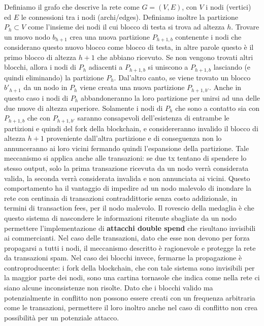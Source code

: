Definiamo il grafo che descrive la rete come $G = (V,E)$, con $V$ i nodi
(vertici) ed $E$ le connessioni tra i nodi (archi/edges). Definiamo
inoltre la partizione $P_h \subset V$ come l'insieme dei nodi il cui
blocco di testa si trova ad altezza $h$. Trovare un nuovo nodo $b_{h+1}$
crea una nuova partizione $P_{h+1,b}$ contenente i nodi che considerano
questo nuovo blocco come blocco di testa, in altre parole questo è il
primo blocco di altezza $h+1$ che abbiano ricevuto. Se non vengono
trovati altri blocchi, allora i nodi di $P_h$ adiacenti a $P_{h+1,b}$ si
uniscono a $P_{h+1,b}$ lasciando (e quindi eliminando) la partizione
$P_h$. Dal'altro canto, se viene trovato un blocco $b'_{h+1}$ da un nodo
in $P_h$ viene creata una nuova partizione $P_{h+1,b'}$. Anche in questo
caso i nodi di $P_h$ abbandoneranno la loro partizione per unirsi ad una
delle due nuove di altezza superiore. Solamente i nodi di $P_h$ che sono
a contatto sia con $P_{h+1,b}$ che con $P_{h+1,b'}$ saranno consapevoli
dell'esistenza di entrambe le partizioni e quindi del fork della
blockchain, e considereranno invalido il blocco di altezza $h+1$
proveniente dall'altra partizione e di conseguenza non lo annunceranno
ai loro vicini fermando quindi l'espansione della partizione. Tale
meccanismo si applica anche alle transazioni: se due tx tentano di
spendere lo stesso output, solo la prima transazione ricevuta da un nodo
verrà considerata valida, la seconda verrà considerata invalida e non
annunciata ai vicini. Questo comportamento ha il vantaggio di impedire
ad un nodo malevolo di inondare la rete con centinaia di transazioni
contraddittorie senza costo addizionale, in termini di transaction fees,
per il nodo malevolo. Il rovescio della medaglia è che questo sistema di
nascondere le informazioni ritenute sbagliate da un nodo permettere
l'implementazione di \textbf{attacchi double spend} che risultano
invisibili ai commercianti. Nel caso delle transazioni, dato che esse
non devono per forza propagarsi a tutti i nodi, il meccanismo descritto
è ragionevole e protegge la rete da transazioni spam. Nel caso dei
blocchi invece, fermarne la propagazione è controproducente: i fork
della blockchain, che con tale sistema sono invisibili per la maggior
parte dei nodi, sono una cartina tornasole che indica come nella rete ci
siano alcune inconsistenze non risolte. Dato che i blocchi valido ma
potenzialmente in conflitto non possono essere creati con un frequenza
arbitraria come le transazioni, permettere il loro inoltro anche nel
caso di conflitto non crea possibilità per un potenziale attacco.

